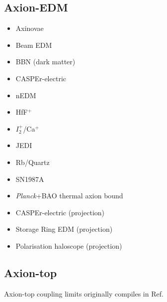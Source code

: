 \documentclass[8pt,twocolumn]{extarticle}
\begin{document}
\begin{mdframed}
\vspace{-1em}
\section{Axion-EDM}\vspace{-0.5em}
\begin{itemize}\setlength\itemsep{-0.5em}
\item Axinovae~\cite{Fox:2023aat}
	\item Beam EDM~\cite{Schulthess:2022pbp}
		\item BBN (dark matter)~\cite{Blum:2014vsa}
	\item CASPEr-electric~\cite{Aybas:2021nvn}
	\item nEDM~\cite{Abel:2017rtm}
	\item HfF$^+$~\cite{Roussy:2020ily}
	\item $I_2^+$/Ca$^+$~\cite{Madge:2024aot}
	\item JEDI~\cite{JEDI:2022hxa}
	\item Rb/Quartz~\cite{Zhang:2022ewz}
	\item SN1987A~\cite{Lucente:2022vuo}
	\item \emph{Planck}+BAO thermal axion bound~\cite{Caloni:2022uya}
	\item CASPEr-electric (projection)~\cite{JacksonKimball:2017elr}	
	\item Storage Ring EDM (projection)~\cite{JacksonKimball:2017elr}	
	\item Polarisation haloscope (projection)~\cite{Berlin:2022mia}
\end{itemize}
\end{mdframed}


\begin{mdframed}
\vspace{-1em}
\section{Axion-top}\vspace{-0.5em}
Axion-top coupling limits originally compiles in Ref.~\cite{Esser:2023fdo}
\end{mdframed}
\end{document}
